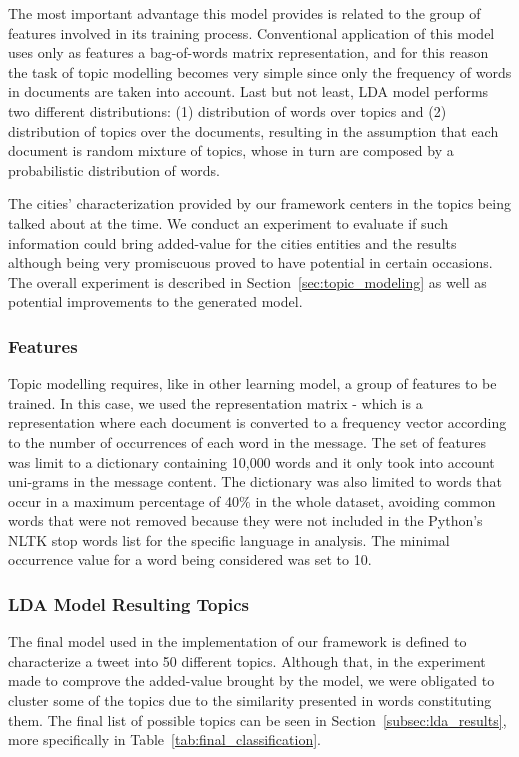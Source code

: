 The most important advantage this model provides is related to the group of features involved in its training process. Conventional application of this model uses only as features a bag-of-words matrix representation, and for this reason the task of topic modelling becomes very simple since only the frequency of words in documents are taken into account. Last but not least, \gls{LDA} model performs two different distributions: (1) distribution of words over topics and (2) distribution of topics over the documents, resulting in the assumption that each document is random mixture of topics, whose in turn are composed by a probabilistic distribution of words.

The cities' characterization provided by our framework centers in the topics being talked about at the time. We conduct an experiment to evaluate if such information could bring added-value for the cities entities and the results although being very promiscuous proved to have potential in certain occasions. The overall experiment is described in Section~\ref{sec:topic_modeling} as well as potential improvements to the generated model.

\subsubsection{Features}
Topic modelling requires, like in other learning model, a group of features to be trained. In this case, we used the  representation matrix - which is a representation where each document is converted to a frequency vector according to the number of occurrences of each word in the message. The set of features was limit to a dictionary containing 10,000 words and it only took into account uni-grams in the message content. The dictionary was also limited to words that occur in a maximum percentage of 40$\%$ in the whole dataset, avoiding common words that were not removed because they were not included in the Python's \gls{NLTK} stop words list for the specific language in analysis. The minimal occurrence value for a word being considered was set to 10.

\subsubsection{LDA Model Resulting Topics}
The final model used in the implementation of our framework is defined to characterize a tweet into 50 different topics. Although that, in the experiment made to comprove the added-value brought by the model,  we were obligated to cluster some of the topics due to the similarity presented in words constituting them. The final list of possible topics can be seen in Section~\ref{subsec:lda_results}, more specifically in Table~\ref{tab:final_classification}.

